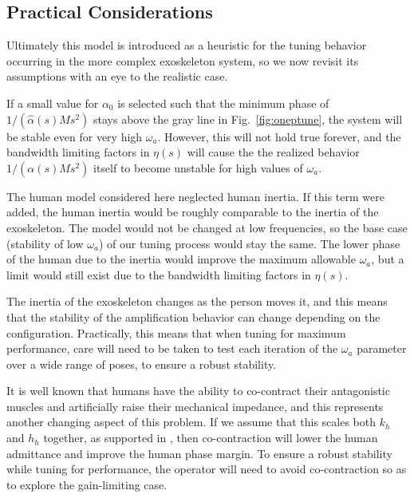 \documentclass[utf8]{frontiersSCNS}
\renewcommand*{\cite}[1]{\citep{#1}}
\begin{document}
\subsection{Practical Considerations}
Ultimately this model is introduced as a heuristic for the tuning behavior occurring in the more complex exoskeleton system, so we now revisit its assumptions with an eye to the realistic case. 

If a small value for $\alpha_0$ is selected such that the minimum phase of $1/(\widehat\alpha(s)Ms^2)$ stays above the gray line in Fig.~\ref{fig:oneptune}, the system will be stable even for very high $\omega_a$. However, this will not hold true forever, and the bandwidth limiting factors in $\eta(s)$ will cause the the realized behavior $1/(\alpha(s)Ms^2)$ itself to become unstable for high values of $\omega_a$. 

The human model considered here neglected human inertia. If this term were added, the human inertia would be roughly comparable to the inertia of the exoskeleton. The model would not be changed at low frequencies, so the base case (stability of low $\omega_a$) of our tuning process would stay the same. The lower phase of the human due to the inertia would improve the maximum allowable $\omega_a$, but a limit would still exist due to the bandwidth limiting factors in $\eta(s)$.

The inertia of the exoskeleton changes as the person moves it, and this means that the stability of the amplification behavior can change depending on the configuration. Practically, this means that when tuning for maximum performance, care will need to be taken to test each iteration of the $\omega_a$ parameter over a wide range of poses, to ensure a robust stability. 

It is well known that humans have the ability to co-contract their antagonistic muscles and artificially raise their mechanical impedance, and this represents another changing aspect of this problem. If we assume that this scales both $k_h$ and $h_h$ together, as supported in \cite{HeHuangThomasSentis2020TNSRE}, then co-contraction will lower the human admittance and improve the human phase margin. To ensure a robust stability while tuning for performance, the operator will need to avoid co-contraction so as to explore the gain-limiting case.


\end{document}
